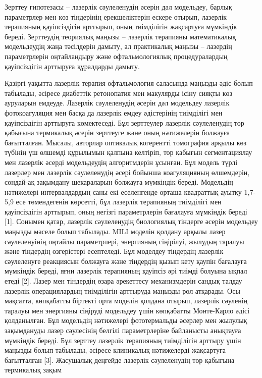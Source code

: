 \begin{multicols}{2}
Зерттеу гипотезасы -- лазерлік сәулеленудің әсерін дәл модельдеу, барлық
параметрлер мен көз тіндерінің ерекшеліктерін ескере отырып, лазерлік
терапияның қауіпсіздігін арттырып, оның тиімділігін жақсартуға мүмкіндік
береді. Зерттеудің теориялық маңызы -- лазерлік терапияны математикалық
модельдеудің жаңа тәсілдерін дамыту, ал практикалық маңызы -- лазердің
параметрлерін оңтайландыру және офтальмологиялық процедуралардың
қауіпсіздігін арттыруға құралдарды дамыту.

Қазіргі уақытта лазерлік терапия офтальмология саласында маңызды әдіс
болып табылады, әсіресе диабеттік ретонопатия мен макулярды ісіну сияқты
көз ауруларын емдеуде. Лазерлік сәулеленудің әсерін дәл модельдеу
лазерлік фотокоагуляция мен басқа да лазерлік емдеу әдістерінің
тиімділігі мен қауіпсіздігін арттыруға көмектеседі. Бұл зерттеулер
лазерлік сәулеленудің тор қабығына термикалық әсерін зерттеуге және оның
нәтижелерін болжауға бағытталған. Мысалы, авторлар оптикалық когерентті
томография арқылы көз түбінің үш өлшемді құрылымын қалпына келтіріп, тор
қабығын сегментациялау мен лазерлік әсерді модельдеудің алгоритмдерін
ұсынған. Бұл модель түрлі лазерлер мен лазерлік сәулеленудің әсері
бойынша коагуляцияның өлшемдерін, сондай-ақ зақымдану шекараларын
болжауға мүмкіндік береді. Модельдің нәтижелері интервалдардың саны екі
еселенгенде орташа квадраттық ауытқу 1,7-5,9 есе төмендегенін көрсетті,
бұл лазерлік терапияның тиімділігі мен қауіпсіздігін арттырып, оның
негізгі параметрлерін бағалауға мүмкіндік береді {[}1{]}. Сонымен қатар,
лазерлік сәулеленудің биологиялық тіндерге әсерін модельдеу маңызды
мәселе болып табылады. MILI моделін қолдану арқылы лазер сәулеленуінің
оңтайлы параметрлері, энергияның сіңірілуі, жылудың таралуы және
тіндердің өзгерістері есептеледі. Бұл моделдеу тіндердің лазерлік
сәулеленуге реакциясын болжауға және тіндердің қызып кету қаупін
бағалауға мүмкіндік береді, яғни лазерлік терапияның қауіпсіз әрі тиімді
болуына ықпал етеді {[}2{]}. Лазер мен тіндердің өзара әрекеттесу
механизмдерін сандық талдау лазерлік операциялардың тиімділігін
арттыруда маңызды рөл атқарады. Осы мақсатта, көпқабатты біртекті орта
моделін қолдана отырып, лазерлік сәуленің таралуы мен энергияны сіңіруді
модельдеу үшін көпқабатты Монте-Карло әдісі қолданылған. Бұл модельдің
нәтижелері фототермальды әсерлер мен жылулық зақымдануды лазер
сәулесінің белгілі параметрлеріне байланысты анықтауға мүмкіндік береді.
Бұл зерттеу лазерлік терапияның тиімділігін арттыру үшін маңызды болып
табылады, әсіресе клиникалық нәтижелерді жақсартуға бағытталған {[}3{]}.
Жасушалық деңгейде лазерлік сәулеленудің тор қабығына термикалық зақым

\end{multicols}
